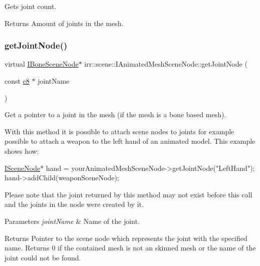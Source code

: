 Gets joint count. 

\begin{DoxyReturn}{Returns}
Amount of joints in the mesh. 
\end{DoxyReturn}
\mbox{\label{classirr_1_1scene_1_1IAnimatedMeshSceneNode_ac7b64a5ddbe5d570dc5276b894a63619}} 
\subsubsection{\texorpdfstring{get\+Joint\+Node()}{getJointNode()}\hspace{0.1cm}{\footnotesize\ttfamily [1/2]}}
{\footnotesize\ttfamily virtual \hyperlink{classirr_1_1scene_1_1IBoneSceneNode}{I\+Bone\+Scene\+Node}$\ast$ irr\+::scene\+::\+I\+Animated\+Mesh\+Scene\+Node\+::get\+Joint\+Node (\begin{DoxyParamCaption}\item[{const \hyperlink{namespaceirr_a9395eaea339bcb546b319e9c96bf7410}{c8} $\ast$}]{joint\+Name }\end{DoxyParamCaption})\hspace{0.3cm}{\ttfamily [pure virtual]}}



Get a pointer to a joint in the mesh (if the mesh is a bone based mesh). 

With this method it is possible to attach scene nodes to joints for example possible to attach a weapon to the left hand of an animated model. This example shows how\+: 
\begin{DoxyCode}
\hyperlink{classirr_1_1scene_1_1ISceneNode_a9894d951df2f720924f891e0a7b9fac2}{ISceneNode}* hand =
    yourAnimatedMeshSceneNode->getJointNode(\textcolor{stringliteral}{"LeftHand"});
hand->addChild(weaponSceneNode);
\end{DoxyCode}
 Please note that the joint returned by this method may not exist before this call and the joints in the node were created by it. 
\begin{DoxyParams}{Parameters}
{\em joint\+Name} & Name of the joint. \\
\hline
\end{DoxyParams}
\begin{DoxyReturn}{Returns}
Pointer to the scene node which represents the joint with the specified name. Returns 0 if the contained mesh is not an skinned mesh or the name of the joint could not be found. 
\end{DoxyReturn}
\mbox{\label{classirr_1_1scene_1_1IAnimatedMeshSceneNode_ac7b64a5ddbe5d570dc5276b894a63619}} 
